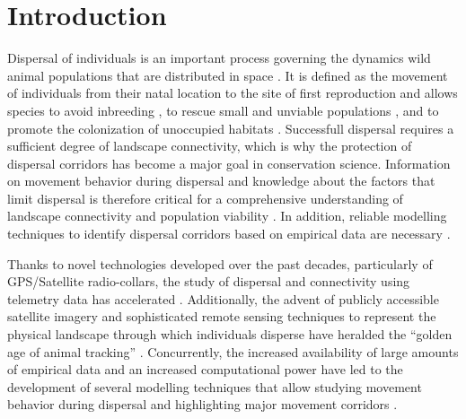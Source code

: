 \documentclass[abstract=on,10pt,a4paper,bibliography=totocnumbered]{article}
\begin{document}


\section{Introduction}
Dispersal of individuals is an important process governing the dynamics wild
animal populations that are distributed in space \citep{Clobert.2012}. It is
defined as the movement of individuals from their natal location to the site of
first reproduction \cite{Howard.1960} and allows species to avoid inbreeding
\citep{Perrin.1999, Perrin.2000, Frankham.2002, Leigh.2012}, to rescue small and
unviable populations \citep{Brown.1977}, and to promote the colonization of
unoccupied habitats \citep{Hanski.1998, MacArthur.2001}. Successfull dispersal
requires a sufficient degree of landscape connectivity, which is why the
protection of dispersal corridors has become a major goal in conservation
science. Information on movement behavior during dispersal and knowledge about
the factors that limit dispersal is therefore critical for a comprehensive
understanding of landscape connectivity and population viability
\citep{Baguette.2013, Vasudev.2015}. In addition, reliable modelling techniques
to identify dispersal corridors based on empirical data are necessary
\citep{Diniz.2019}.

Thanks to novel technologies developed over the past decades, particularly of
GPS/Satellite radio-collars, the study of dispersal and connectivity using
telemetry data has accelerated \citep{Jonsson.2016, Williams.2019}.
Additionally, the advent of publicly accessible satellite imagery and
sophisticated remote sensing techniques to represent the physical landscape
through which individuals disperse have heralded the ``golden age of animal
tracking'' \citep{Kays.2015}. Concurrently, the increased availability of large
amounts of empirical data and an increased computational power have led to the
development of several modelling techniques that allow studying movement
behavior during dispersal and highlighting major movement corridors
\citep{Boyce.2002, Fortin.2005, Cushman.2010, Zeller.2012, Diniz.2019}.
\end{document}
